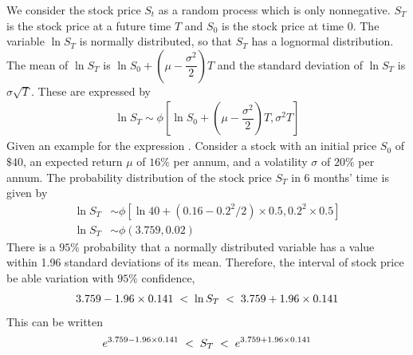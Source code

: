 We consider the stock price $S_t$ as a random process which is only nonnegative. $S_T$ is the stock price at a future time $T$ and $S_0$ is the stock price at time $0$.  The variable $\ln S_T$ is normally distributed, so that $S_T$ has a
lognormal distribution. The mean of $\ln S_T$ is $\ln S_0+(\mu -\dfrac{\sigma^2}{2})T$ and the standard
deviation of $\ln S_T$ is $\sigma\sqrt{T}$. These are expressed by
\begin{align}
	\ln S_T \sim \phi[\ln S_0 + (\mu - \dfrac{\sigma^2}{2})T, \sigma^2T] \label{2.3.5}
\end{align}
Given an example for the expression . Consider a stock with an initial price $S_0$ of $\$40$, an expected return $\mu$ of $16\%$ per
annum, and a volatility $\sigma$ of $20\%$ per annum. The probability
distribution of the stock price $S_T$ in $6$ months’ time is given by
\begin{align*}
	\ln S_T &\sim \phi[\ln 40 + (0.16 - 0.2^2/2)\times 0.5, 0.2^2\times 0.5]\\
	\ln S_T &\sim \phi(3.759, 0.02)
\end{align*}
There is a $95\%$ probability that a normally distributed variable has a value within
1.96 standard deviations of its mean. Therefore, the interval of stock price be able variation with $95\%$ confidence,
\begin{align*}
	3.759-1.96\times 0.141 \hspace{0.1cm}<\hspace{0.1cm} \ln S_T\hspace{0.1cm} <\hspace{0.1cm} 3.759+1.96\times 0.141
\end{align*}
This can be written
\begin{align*}
	e^{3.759-1.96\times 0.141}\hspace{0.1cm}<\hspace{0.1cm} S_T\hspace{0.1cm} <\hspace{0.1cm} e^{3.759+1.96\times 0.141}
\end{align*} 
